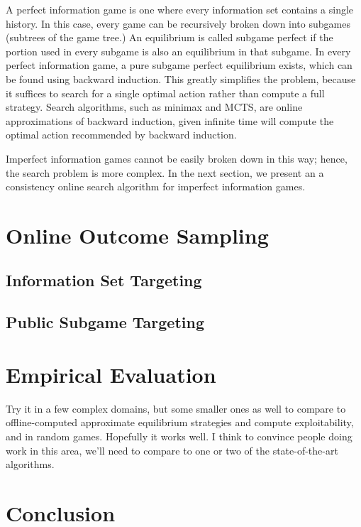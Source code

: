 \documentclass[letterpaper]{article}
\begin{document}
A perfect information game is one where every information set contains a single history. In this case, every game can be recursively broken down into 
subgames (subtrees of the game tree.) An equilibrium is called subgame perfect if the portion used in every subgame is also an equilibrium in that 
subgame. In every perfect information game, a pure subgame perfect equilibrium exists, which can be found using backward induction. 
This greatly simplifies the problem, because it suffices to search for a single optimal action rather than compute a full strategy. 
Search algorithms, such as minimax and MCTS, are online approximations of backward induction, given infinite time will compute the optimal action
recommended by backward induction. 

Imperfect information games cannot be easily broken down in this way; hence, the search problem is more complex. In the next section, 
we present an a consistency online search algorithm for imperfect information games. 

\section{Online Outcome Sampling}


\subsection{Information Set Targeting}

\subsection{Public Subgame Targeting}

\section{Empirical Evaluation}

Try it in a few complex domains, but some smaller ones as well to compare to offline-computed approximate equilibrium strategies and compute exploitability, and in random games. 
Hopefully it works well. I think to convince people doing work in this area, we'll need 
to compare to one or two of the state-of-the-art algorithms. 

\section{Conclusion}



\end{document}

